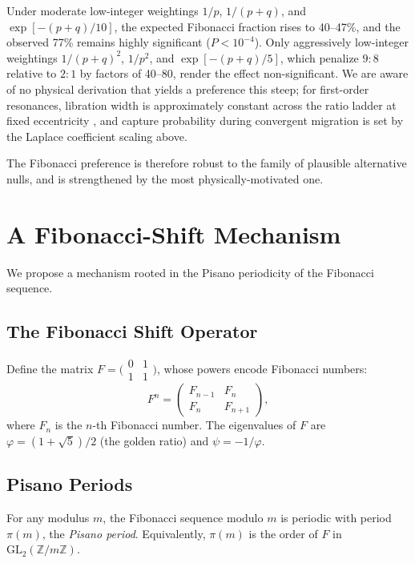 \documentclass[twocolumn,11pt]{article}
\begin{document}
Under moderate low-integer weightings $1/p$, $1/(p+q)$, and
$\exp[-(p+q)/10]$, the expected Fibonacci fraction rises to
40--47\%, and the observed 77\% remains highly significant
($P < 10^{-4}$). Only aggressively low-integer weightings
$1/(p+q)^2$, $1/p^2$, and $\exp[-(p+q)/5]$, which penalize $9\!:\!8$
relative to $2\!:\!1$ by factors of 40--80, render the effect
non-significant. We are aware of no physical derivation that yields a
preference this steep; for first-order resonances, libration width is
approximately constant across the ratio ladder at fixed eccentricity
\citep{murray1999}, and capture probability during convergent
migration is set by the Laplace coefficient scaling above.

The Fibonacci preference is therefore robust to the family of
plausible alternative nulls, and is strengthened by the most
physically-motivated one.

\section{A Fibonacci-Shift Mechanism}
\label{sec:mechanism}

We propose a mechanism rooted in the Pisano periodicity of the
Fibonacci sequence.

\subsection{The Fibonacci Shift Operator}

Define the matrix $F = \bigl(\begin{smallmatrix} 0 & 1 \\ 1 & 1
\end{smallmatrix}\bigr)$, whose powers encode Fibonacci numbers:
\begin{equation}
F^n = \begin{pmatrix} F_{n-1} & F_n \\ F_n & F_{n+1} \end{pmatrix},
\end{equation}
where $F_n$ is the $n$-th Fibonacci number.  The eigenvalues of $F$
are $\varphi = (1+\sqrt{5})/2$ (the golden ratio) and
$\psi = -1/\varphi$.

\subsection{Pisano Periods}

For any modulus $m$, the Fibonacci sequence modulo $m$ is periodic
with period $\pi(m)$, the \emph{Pisano period}.  Equivalently,
$\pi(m)$ is the order of $F$ in $\mathrm{GL}_2(\mathbb{Z}/m\mathbb{Z})$.
\end{document}
